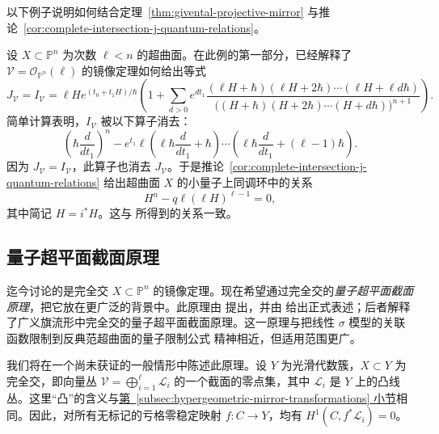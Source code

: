 以下例子说明如何结合定理~\ref{thm:givental-projective-mirror} 与推论~\ref{cor:complete-intersection-j-quantum-relations}。
{
\renewcommand{\theHexam}{11.2.1.2.continued}
\begin{example}[续]\label{ex:fano-hypersurface-quantum-relation}
设 $X\subset\mathbb P^n$ 为次数 $\ell<n$ 的超曲面。在此例的第一部分，已经解释了 $\mathcal V=\mathcal O_{\mathbb P^n}(\ell)$ 的镜像定理如何给出等式
\[
J_{\mathcal V}=I_{\mathcal V}=\ell H e^{(t_0+t_1H)/\hbar}
\left(1+\sum_{d>0}e^{dt_1}
\frac{(\ell H+\hbar)(\ell H+2\hbar)\cdots(\ell H+\ell d\hbar)}
{\bigl((H+\hbar)(H+2\hbar)\cdots(H+d\hbar)\bigr)^{n+1}}\right).
\]
简单计算表明，$I_{\mathcal V}$ 被以下算子消去：
\[
\left(\hbar\frac d{dt_1}\right)^n
-e^{t_1}\ell\left(\ell\hbar\frac d{dt_1}+\hbar\right)
\cdots\left(\ell\hbar\frac d{dt_1}+(\ell-1)\hbar\right).
\]
因为 $J_{\mathcal V}=I_{\mathcal V}$，此算子也消去 $J_{\mathcal V}$。于是推论~\ref{cor:complete-intersection-j-quantum-relations} 给出超曲面 $X$ 的小量子上同调环中的关系
\[
H^n-q\ell(\ell H)^{\ell-1}=0,
\]
其中简记 $H=i^*H$。这与  所得到的关系一致。
\end{example}}

\subsection{量子超平面截面原理}\label{subsec:quantum-hyperplane-section-principle}
迄今讨论的是完全交 $X\subset\mathbb P^n$ 的镜像定理。现在希望通过完全交的\emph{量子超平面截面原理}，把它放在更广泛的背景中。此原理由  提出，并由  给出正式表述；后者解释了广义旗流形中完全交的量子超平面截面原理。这一原理与把线性 $\sigma$ 模型的关联函数限制到反典范超曲面的量子限制公式  精神相近，但适用范围更广。

我们将在一个尚未获证的一般情形中陈述此原理。设 $Y$ 为光滑代数簇，$X\subset Y$ 为完全交，即向量丛 $\mathcal V=\bigoplus_{i=1}^{\ell}\mathcal L_i$ 的一个截面的零点集，其中 $\mathcal L_i$ 是 $Y$ 上的凸线丛。这里“凸”的含义与\hyperref[subsec:hypergeometric-mirror-transformations]{第~\ref*{subsec:hypergeometric-mirror-transformations} 小节}相同。因此，对所有无标记的亏格零稳定映射 $f:C\to Y$，均有 $H^1(C,f^*\mathcal L_i)=0$。

